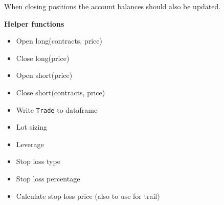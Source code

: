 \documentclass[11pt]{article}
\providecommand{\tightlist}{%
      \setlength{\itemsep}{0pt}\setlength{\parskip}{0pt}}
\begin{document}
When closing positions the account balances should also be updated.

    \textbf{Helper functions}

\begin{itemize}
\tightlist
\item
  Open long(contracts, price)
\item
  Close long(price)
\item
  Open short(price)
\item
  Close short(contracts, price)
\item
  Write \texttt{Trade} to dataframe
\item
  Lot sizing
\item
  Leverage
\item
  Stop loss type
\item
  Stop loss percentage
\item
  Calculate stop loss price (also to use for trail)
\end{itemize}


    
    
    
    
\end{document}
